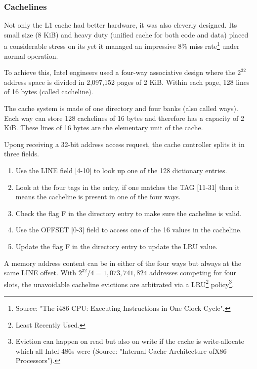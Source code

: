 \subsubsection{Cachelines}
Not only the L1 cache had better hardware, it was also cleverly designed. Its small size (8 KiB) and heavy duty (unified cache for both code and data) placed a considerable stress on its yet it managed an impressive 8\% miss rate\footnote{Source: "The i486 CPU: Executing Instructions in One Clock Cycle".} under normal operation.\\
\par
To achieve this, Intel engineers used a four-way associative design where the $2^{32}$ address space is divided in 2,097,152 pages of 2 KiB. Within each page, 128 lines of 16 bytes (called cacheline).\\
\par
{}
\par
The cache system is made of one directory and four banks (also called ways). Each way can store 128 cachelines of 16 bytes and therefore has a capacity of 2 KiB. These lines of 16 bytes are the elementary unit of the cache.\\
\par
Upong receiving a 32-bit address access request, the cache controller splits it in three fields.\\
\begin{enumerate}
\item Use the LINE field [4-10] to look up one of the 128 dictionary entries.
\item Look at the four tags in the entry, if one matches the TAG [11-31] then it means the cacheline is present in one of the four ways.
\item Check the flag F in the directory entry to make sure the cacheline is valid.
\item Use the OFFSET [0-3] field to access one of the 16 values in the cacheline.
\item Update the flag F in the directory entry to update the LRU value.
\end{enumerate}
\par
A memory address content can be in either of the four ways but always at the same LINE offset. With $2^{32} / 4 = 1,073,741,824$ addresses competing for four slots, the unavoidable cacheline evictions are arbitrated via a LRU\footnote{Least Recently Used.} policy\footnote{Eviction can happen on read but also on write if the cache is write-allocate which all Intel 486s were (Source: "Internal Cache Architecture ofX86 Processors").}.\\
